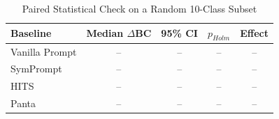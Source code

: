 \begin{table}[t]
\centering
\caption{Paired Statistical Check on a Random 10-Class Subset}
\label{tab:rq1-random-subset-stats}
\small
\begin{tabular}{lcccc}
\toprule
Baseline & Median $\Delta$BC & 95\% CI & $p_{\textit{Holm}}$ & Effect \\
\midrule
Vanilla Prompt & -- & -- & -- & -- \\
SymPrompt      & -- & -- & -- & -- \\
HITS           & -- & -- & -- & -- \\
Panta          & -- & -- & -- & -- \\
\bottomrule
\end{tabular}
\end{table}
